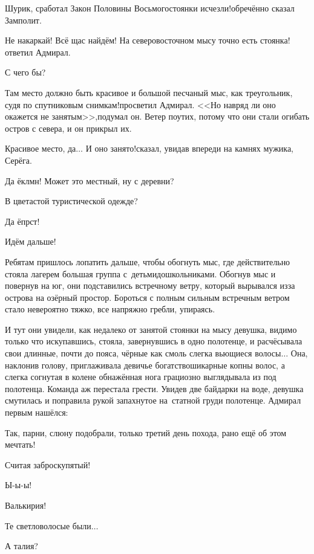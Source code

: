 \diagdash Шурик, сработал Закон Половины Восьмого\cite{Квадригин}\mdash стоянки исчезли!\mdash обречённо сказал Замполит.

\diagdash Не накаркай! Всё щас найдём! На северо\sdash восточном мысу точно есть стоянка!\mdash ответил Адмирал.

\diagdash С чего бы?

\diagdash Там место должно быть красивое и большой песчаный мыс, как треугольник, судя по спутниковым снимкам!\mdash просветил Адмирал. <<Но навряд ли оно окажется не занятым>>,\mdash подумал он. Ветер поутих, потому что они стали огибать остров с севера, и он прикрыл их.

\diagdash Красивое место, да$\ldots$ И оно занято!\mdash сказал, увидав впереди на камнях мужика, Серёга.

\diagdash Да ёклмн! Может это местный, ну с деревни?

\diagdash В цветастой туристической одежде?

\diagdash Да ёпрст!

\diagdash Идём дальше!

Ребятам пришлось лопатить дальше, чтобы обогнуть мыс, где действительно стояла лагерем большая группа с~детьми\sdash дошкольниками. Обогнув мыс и повернув на юг, они подставились встречному ветру, который вырывался из\sdash за острова на озёрный простор. Бороться с полным сильным встречным ветром стало невероятно тяжко, все напряжно гребли, упираясь.

И тут они увидели, как недалеко от занятой стоянки на мысу девушка, видимо только что искупавшись, стояла, завернувшись в одно полотенце, и расчёсывала свои длинные, почти до пояса, чёрные как смоль слегка вьющиеся волосы$\ldots$ Она, наклонив голову, приглаживала девичье богатство\mdash шикарные копны волос, а слегка согнутая в колене обнажённая нога грациозно выглядывала из под полотенца. Команда аж перестала грести. Увидев две байдарки на воде, девушка смутилась и поправила рукой запахнутое на~статной груди полотенце. Адмирал первым нашёлся:

\diagdash Так, парни, слюну подобрали, только третий день похода, рано ещё об этом мечтать!

\diagdash Считая заброску\mdash пятый!

\diagdash Ы-ы-ы!

\diagdash Валькирия!

\diagdash Те светловолосые были$\ldots$

\diagdash А талия?

